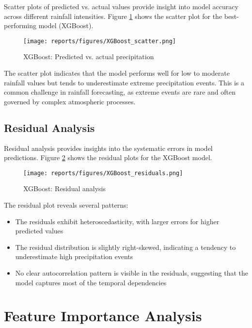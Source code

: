 \documentclass[12pt]{article}
\begin{document}
Scatter plots of predicted vs. actual values provide insight into model accuracy across different rainfall intensities. Figure \ref{fig:xgb_scatter} shows the scatter plot for the best-performing model (XGBoost).

\begin{figure}[h]
\centering
\texttt{[image: reports/figures/XGBoost\_scatter.png]}
\caption{XGBoost: Predicted vs. actual precipitation}
\label{fig:xgb_scatter}
\end{figure}

The scatter plot indicates that the model performs well for low to moderate rainfall values but tends to underestimate extreme precipitation events. This is a common challenge in rainfall forecasting, as extreme events are rare and often governed by complex atmospheric processes.

\subsection{Residual Analysis}
\label{subsec:residual_results}

Residual analysis provides insights into the systematic errors in model predictions. Figure \ref{fig:xgb_residuals} shows the residual plots for the XGBoost model.

\begin{figure}[h]
\centering
\texttt{[image: reports/figures/XGBoost\_residuals.png]}
\caption{XGBoost: Residual analysis}
\label{fig:xgb_residuals}
\end{figure}

The residual plot reveals several patterns:
\begin{itemize}
    \item The residuals exhibit heteroscedasticity, with larger errors for higher predicted values
    \item The residual distribution is slightly right-skewed, indicating a tendency to underestimate high precipitation events
    \item No clear autocorrelation pattern is visible in the residuals, suggesting that the model captures most of the temporal dependencies
\end{itemize}

\section{Feature Importance Analysis}
\label{sec:feature_importance_results}
\end{document}
